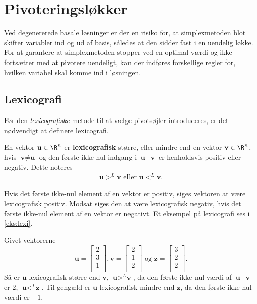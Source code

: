 \section{Pivoteringsløkker}
Ved degenererede basale løsninger er der en risiko for, at simplexmetoden blot skifter variabler ind og ud af basis, således at den sidder fast i en uendelig løkke.  
For at garantere at simplexmetoden stopper ved en optimal værdi og ikke fortsætter med at pivotere uendeligt, kan der indføres forskellige regler for, hvilken variabel skal komme ind i løsningen.

\subsection{Lexicografi}
%
Før den \textit{lexicografiske} metode til at vælge pivotsøjler introduceres, er det nødvendigt at definere lexicografi.
\begin{defn}{}{}
En vektor $\textbf{u}\in \R^n$ er \textbf{lexicografisk} større, eller mindre end en vektor $\textbf{v}\in \R^n$, hvis $\textbf{v} \neq \textbf{u}$ og den første ikke-nul indgang i $\textbf{u}-\textbf{v}$ er henholdsvis positiv eller negativ. Dette noteres
\begin{align*}
\textbf{u} >^L \textbf{v} \text{ eller } \textbf{u} <^L \textbf{v}.
\end{align*} 
\end{defn}
\noindent
Hvis det første ikke-nul element af en vektor er positiv, siges vektoren at være lexicografisk positiv. Modsat siges den at være lexicografisk negativ, hvis det første ikke-nul element af en vektor er negativt. Et eksempel på lexicografi ses i \ref{eks:lexi}.
\\
%
\begin{eks}\label{eks:lexi}
Givet vektorerne
$$\textbf{u}=
\begin{bmatrix}
2\\
3\\
1\\
\end{bmatrix}
,
\textbf{v}=
\begin{bmatrix}
2\\
1\\
2\\
\end{bmatrix}
\text{ og }
\textbf{z}=
\begin{bmatrix}
3\\
2\\
2\\
\end{bmatrix}
.$$
Så er $\textbf{u}$  lexicografisk større end $\textbf{v}$, $\textbf{u} >^L \textbf{v}$, da den første ikke-nul værdi af $\textbf{u}-\textbf{v}$ er $2$, $\textbf{u} <^L \textbf{z}$.
Til gengæld er $\textbf{u}$ lexicografisk mindre end $\textbf{z}$, da den første ikke-nul værdi er $-1$.
\end{eks}
